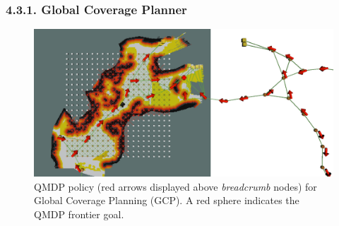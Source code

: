 \documentclass[letterpaper]{article} %
\begin{document}
\subsubsection{4.3.1. Global Coverage Planner} \label{sssec:GCP}
\begin{figure}[t!]
  \centering
  \includegraphics[width=.8\columnwidth]{figures/QMDP_Policy.png}
  \caption{QMDP policy (red arrows displayed above \textit{breadcrumb} nodes) for Global Coverage Planning (GCP). A red sphere indicates the QMDP frontier goal.}
  \label{fig:graph-level-planner}
\end{figure}
\end{document}
